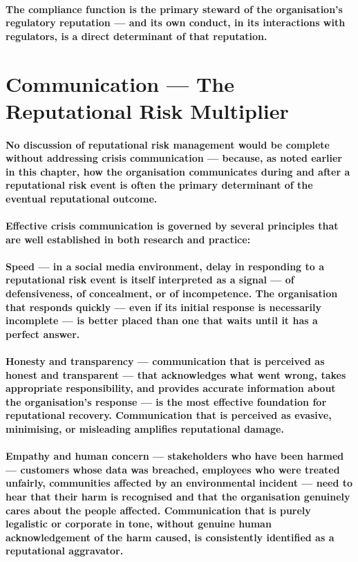 \paragraph{The compliance function is the primary steward of the organisation's regulatory reputation — and its own conduct, in its interactions with regulators, is a direct determinant of that reputation.}

\section{Communication — The Reputational Risk Multiplier}
\paragraph{No discussion of reputational risk management would be complete without addressing \textbf{crisis communication} — because, as noted earlier in this chapter, how the organisation communicates during and after a reputational risk event is often the primary determinant of the eventual reputational outcome.}
\paragraph{Effective crisis communication is governed by several principles that are well established in both research and practice:}
\paragraph{\textbf{Speed} — in a social media environment, delay in responding to a reputational risk event is itself interpreted as a signal — of defensiveness, of concealment, or of incompetence. The organisation that responds quickly — even if its initial response is necessarily incomplete — is better placed than one that waits until it has a perfect answer.}
\paragraph{\textbf{Honesty and transparency} — communication that is perceived as honest and transparent — that acknowledges what went wrong, takes appropriate responsibility, and provides accurate information about the organisation's response — is the most effective foundation for reputational recovery. Communication that is perceived as evasive, minimising, or misleading amplifies reputational damage.}
\paragraph{\textbf{Empathy and human concern} — stakeholders who have been harmed — customers whose data was breached, employees who were treated unfairly, communities affected by an environmental incident — need to hear that their harm is recognised and that the organisation genuinely cares about the people affected. Communication that is purely legalistic or corporate in tone, without genuine human acknowledgement of the harm caused, is consistently identified as a reputational aggravator.}
